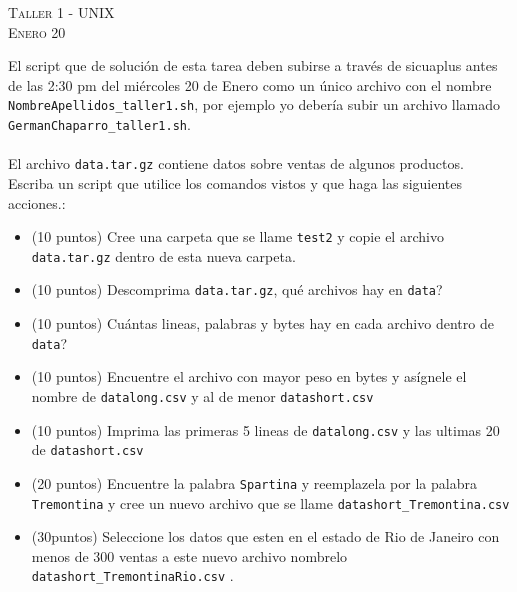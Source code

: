 \documentclass[11pt]{article}
\begin{document}
\begin{center}
\textsc{\LARGE Taller 1 - UNIX}\\
\textsc{\large Enero 20 }
\end{center}


El script  que de soluci\'on de esta tarea deben subirse a
trav\'es de sicuaplus antes de las 2:30 pm del mi\'ercoles 20 de Enero como
un \'unico archivo con el nombre
\verb"NombreApellidos_taller1.sh", por ejemplo yo deber\'ia subir un
archivo llamado \verb"GermanChaparro_taller1.sh".\\
\\
El archivo \verb"data.tar.gz" contiene datos sobre ventas de algunos productos.\\

Escriba un script que utilice los comandos vistos y que haga las siguientes acciones.:
\begin{itemize}
\item (10 puntos) Cree una carpeta que se llame \verb+test2+ y copie el archivo \verb|data.tar.gz| dentro de esta nueva carpeta. 
\item (10 puntos) Descomprima \verb|data.tar.gz|, qu\'e archivos hay en \verb|data|?
\item (10 puntos) Cu\'antas lineas, palabras y bytes hay en cada archivo dentro de \verb|data|?
\item (10 puntos) Encuentre el archivo con mayor peso en bytes y as\'ignele el nombre de \verb|datalong.csv| y al de menor \verb|datashort.csv|
\item (10 puntos) Imprima las primeras 5 lineas de \verb|datalong.csv| y las ultimas 20 de \verb|datashort.csv|
\item (20 puntos) Encuentre la palabra \verb|Spartina| y reemplazela por la palabra \verb|Tremontina| y cree un nuevo archivo que se llame \verb|datashort_Tremontina.csv|

\item (30puntos) Seleccione los datos que esten en el estado de Rio de Janeiro con menos de 300 ventas a este nuevo archivo nombrelo \verb+datashort_TremontinaRio.csv+ .
 
\end{itemize}
\end{document}
